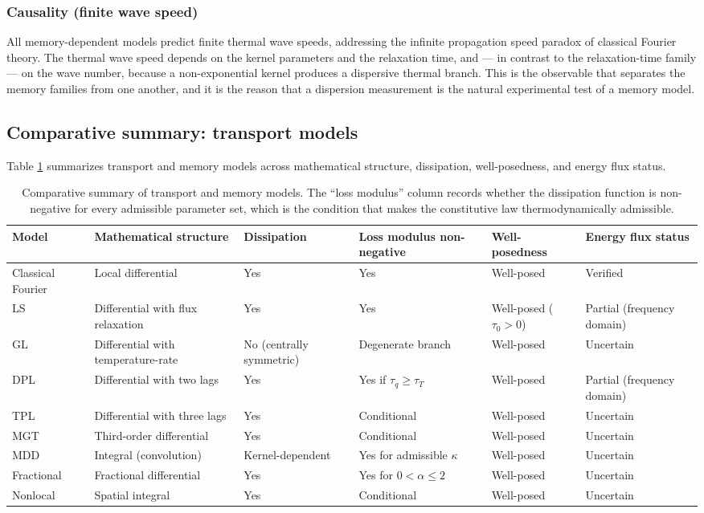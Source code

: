 \subsubsection{Causality (finite wave speed)}

All memory-dependent models predict finite thermal wave speeds, addressing the infinite propagation speed paradox of classical Fourier theory. The thermal wave speed depends on the kernel parameters and the relaxation time, and --- in contrast to the relaxation-time family --- on the wave number, because a non-exponential kernel produces a dispersive thermal branch. This is the observable that separates the memory families from one another, and it is the reason that a dispersion measurement is the natural experimental test of a memory model.

\subsection{Comparative summary: transport models}

Table \ref{tab:transport_comparison} summarizes transport and memory models across mathematical structure, dissipation, well-posedness, and energy flux status.

\begin{table}[htbp]
\centering
\small
\caption{Comparative summary of transport and memory models. The ``loss modulus'' column records whether the dissipation function is non-negative for every admissible parameter set, which is the condition that makes the constitutive law thermodynamically admissible.}
\label{tab:transport_comparison}
\begin{tabularx}{\textwidth}{@{}lXXXXX@{}}
\toprule
\textbf{Model} & \textbf{Mathematical structure} & \textbf{Dissipation} & \textbf{Loss modulus non-negative} & \textbf{Well-posedness} & \textbf{Energy flux status} \\
\midrule
Classical Fourier & Local differential & Yes & Yes & Well-posed & Verified \\
LS & Differential with flux relaxation & Yes & Yes & Well-posed ($\tau_0 > 0$) & Partial (frequency domain) \\
GL & Differential with temperature-rate & No (centrally symmetric) & Degenerate branch & Well-posed & Uncertain \\
DPL & Differential with two lags & Yes & Yes if $\tau_q \geq \tau_T$ & Well-posed & Partial (frequency domain) \\
TPL & Differential with three lags & Yes & Conditional & Well-posed & Uncertain \\
MGT & Third-order differential & Yes & Conditional & Well-posed & Uncertain \\
MDD & Integral (convolution) & Kernel-dependent & Yes for admissible $\kappa$ & Well-posed & Uncertain \\
Fractional & Fractional differential & Yes & Yes for $0 < \alpha \leq 2$ & Well-posed & Uncertain \\
Nonlocal & Spatial integral & Yes & Conditional & Well-posed & Uncertain \\
\bottomrule
\end{tabularx}
\end{table}

